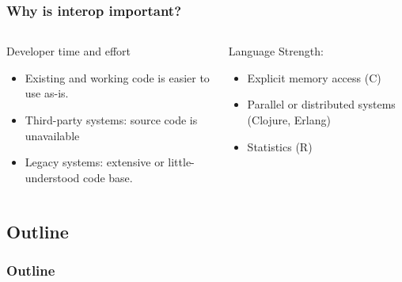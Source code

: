 \documentclass{beamer}
\begin{document}
\begin{frame}
  \frametitle{Why is interop important?}
  
  \begin{columns}[t]
  \begin{column}{0.5\textwidth}
  Developer time and effort
  \begin{itemize}
	\item Existing and working code is easier to use as-is.
  	\item Third-party systems: source code is unavailable
	\item Legacy systems: extensive or little-understood code base.
  \end{itemize}
  \end{column}

  \begin{column}{0.6\textwidth}
  Language Strength:
  \begin{itemize}
  	\item Explicit memory access (C)
  	\item Parallel or distributed systems (Clojure, Erlang)
  	\item Statistics (R)
  \end{itemize}
  \end{column}
  \end{columns}
%

  
\end{frame}

\subsection*{Outline}

\begin{frame}
  \frametitle{Outline}
  \tableofcontents[hideallsubsections]
\end{frame}
\end{document}
